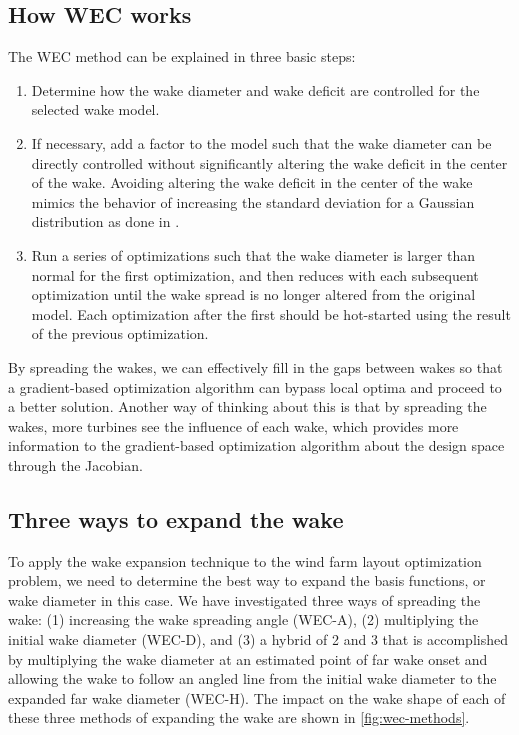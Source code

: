 \documentclass[a4paper]{jpconf}
\begin{document}
\subsection{How WEC works}

The WEC method can be explained in three basic steps:
\begin{enumerate}[label=\arabic*)]
	\item Determine how the wake diameter and wake deficit are controlled for the selected wake model.
    \item If necessary, add a factor to the model such that the wake diameter can be directly controlled without significantly altering the wake deficit in the center of the wake. Avoiding altering the wake deficit in the center of the wake mimics the behavior of increasing the standard deviation for a Gaussian distribution as done in \cite{mobahi2015}.
    \item Run a series of optimizations such that the wake diameter is larger than normal for the first optimization, and then reduces with each subsequent optimization until the wake spread is no longer altered from the original model. Each optimization after the first should be hot-started using the result of the previous optimization.
\end{enumerate}

By spreading the wakes, we can effectively fill in the gaps between wakes so that a gradient-based optimization algorithm can bypass local optima and proceed to a better solution. Another way of thinking about this is that by spreading the wakes, more turbines see the influence of each wake, which provides more information to the gradient-based optimization algorithm about the design space through the Jacobian. 

\subsection{Three ways to expand the wake}\label{sec:wecmethods} 
To apply the wake expansion technique to the wind farm layout optimization problem, we need to determine the best way to expand the basis functions, or wake diameter in this case. We have investigated three ways of spreading the wake: (1) increasing the wake spreading angle (WEC-A), (2) multiplying the initial wake diameter (WEC-D), and (3) a hybrid of 2 and 3 that is accomplished by multiplying the wake diameter at an estimated point of far wake onset and allowing the wake to follow an angled line from the initial wake diameter to the expanded far wake diameter (WEC-H). The impact on the wake shape of each of these three methods of expanding the wake are shown in \cref{fig:wec-methods}.
\end{document}
